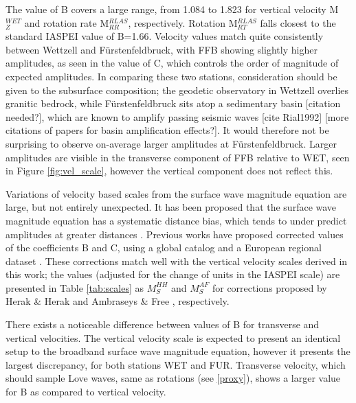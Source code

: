 \documentclass{gji}
\begin{document}
The value of B covers a large range, from 1.084 to 1.823 for vertical velocity M$^{WET}_{Z}$ and rotation rate M$^{RLAS}_{RR}$, respectively. Rotation M$^{RLAS}_{RT}$ falls closest to the standard IASPEI value of B=1.66. Velocity values match quite consistently between Wettzell and F\"urstenfeldbruck, with FFB showing slightly higher amplitudes, as seen in the value of C, which controls the order of magnitude of expected amplitudes. In comparing these two stations, consideration should be given to the subsurface composition; the geodetic observatory in Wettzell overlies granitic bedrock, while F\"urstenfeldbruck sits atop a sedimentary basin [citation needed?], which are known to amplify passing seismic waves [cite Rial1992] [more citations of papers for basin amplification effects?]. It would therefore not be surprising to observe on-average larger amplitudes at F\"urstenfeldbruck. Larger amplitudes are visible in the transverse component of FFB relative to WET, seen in Figure \ref{fig:vel_scale}, however the vertical component does not reflect this. 

Variations of velocity based scales from the surface wave magnitude equation are large, but not entirely unexpected. It has been proposed that the surface wave magnitude equation has a systematic distance bias, which tends to under predict amplitudes at greater distances \cite{herak1993distance}. Previous works have proposed corrected values of the coefficients B and C, using a global catalog \cite{herak1993distance} and a European regional dataset \cite{ambraseys1997surface}. These corrections match well with the vertical velocity scales derived in this work; the values (adjusted for the change of units in the IASPEI scale) are presented in Table \ref{tab:scales} as $M_S^{HH}$ and $M_S^{AF}$ for corrections proposed by Herak \& Herak  and Ambraseys \& Free , respectively. 

There exists a noticeable difference between values of B for transverse and vertical velocities. The vertical velocity scale is expected to present an identical setup to the broadband surface wave magnitude equation, however it presents the largest discrepancy, for both stations WET and FUR. Transverse velocity, which should sample Love waves, same as rotations (see \ref{proxy}), shows a larger value for B as compared to vertical velocity.
\end{document}
